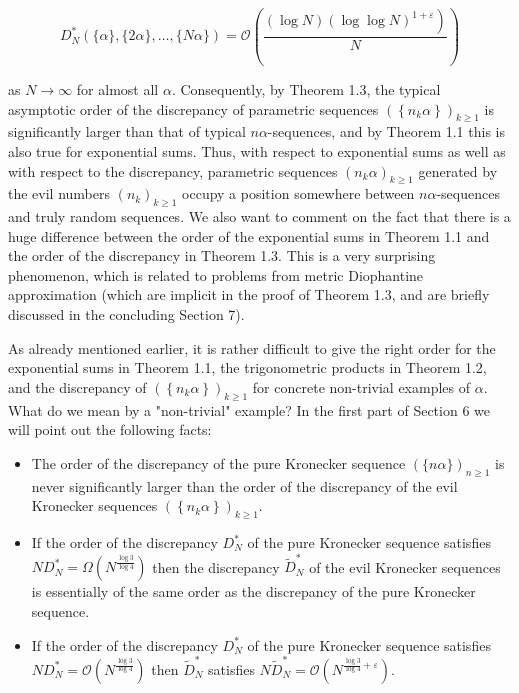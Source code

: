 \documentclass[10pt]{article}
\begin{document}
\begin{equation*}
D_{N}^{*}(\{\alpha\},\{2 \alpha\}, \ldots,\{N \alpha\})=\mathcal{O}\left(\frac{\left.(\log N)(\log \log N)^{1+\varepsilon}\right)}{N}\right) \tag{1.15}
\end{equation*}


as $N \rightarrow \infty$ for almost all $\alpha$. Consequently, by Theorem 1.3, the typical asymptotic order of the discrepancy of parametric sequences $\left(\left\{n_{k} \alpha\right\}\right)_{k \geqslant 1}$ is significantly larger than that of typical $n \alpha$-sequences, and by Theorem 1.1 this is also true for exponential sums. Thus, with respect to exponential sums as well as with respect to the discrepancy, parametric sequences $\left(n_{k} \alpha\right)_{k \geqslant 1}$ generated by the evil numbers $\left(n_{k}\right)_{k \geqslant 1}$ occupy a position somewhere between $n \alpha$-sequences and truly random sequences. We also want to comment on the fact that there is a huge difference between the order of the exponential sums in Theorem 1.1 and the order of the discrepancy in Theorem 1.3. This is a very surprising phenomenon, which is related to problems from metric Diophantine approximation (which are implicit in the proof of Theorem 1.3, and are briefly discussed in the concluding Section 7).

As already mentioned earlier, it is rather difficult to give the right order for the exponential sums in Theorem 1.1, the trigonometric products in Theorem 1.2, and the discrepancy of $\left(\left\{n_{k} \alpha\right\}\right)_{k \geqslant 1}$ for concrete non-trivial examples of $\alpha$. What do we mean by a "non-trivial" example? In the first part of Section 6 we will point out the following facts:

\begin{itemize}
  \item[-] The order of the discrepancy of the pure Kronecker sequence $(\{n \alpha\})_{n \geqslant 1}$ is never significantly larger than the order of the discrepancy of the evil Kronecker sequences $\left(\left\{n_{k} \alpha\right\}\right)_{k \geqslant 1}$.
\end{itemize}

\begin{itemize}
  \item[-] If the order of the discrepancy $D_{N}^{*}$ of the pure Kronecker sequence satisfies $N D_{N}^{*}=\Omega\left(N^{\frac{\log 3}{\log 4}}\right)$ then the discrepancy $\widetilde{D}_{N}^{*}$ of the evil Kronecker sequences is essentially of the same order as the discrepancy of the pure Kronecker sequence.
  \item[-] If the order of the discrepancy $D_{N}^{*}$ of the pure Kronecker sequence satisfies $N D_{N}^{*}=\mathcal{O}\left(N^{\frac{\log 3}{\log 4}}\right)$ then $\widetilde{D}_{N}^{*}$ satisfies $N \widetilde{D}_{N}^{*}=\mathcal{O}\left(N^{\frac{\log 3}{\log 4}+\varepsilon}\right)$.
\end{itemize}
\end{document}
